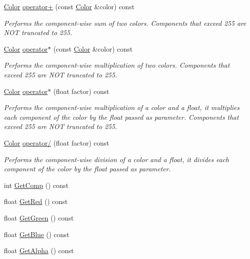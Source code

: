 \begin{DoxyCompactItemize}
\hyperlink{classColor}{Color} \hyperlink{classColor_acd40b26ca2f9217b5cde1e5c1251ef04}{operator+} (const \hyperlink{classColor}{Color} \&color) const
\begin{DoxyCompactList}\small\item\em Performs the component-\/wise sum of two colors. Components that exceed 255 are N\+OT truncated to 255. \end{DoxyCompactList}\item 
\hyperlink{classColor}{Color} \hyperlink{classColor_a6cc052b0ca852fb8703e642e49fcdbe9}{operator$\ast$} (const \hyperlink{classColor}{Color} \&color) const
\begin{DoxyCompactList}\small\item\em Performs the component-\/wise multiplication of two colors. Components that exceed 255 are N\+OT truncated to 255. \end{DoxyCompactList}\item 
\hyperlink{classColor}{Color} \hyperlink{classColor_a1913ac35b2deeabf7f9bc449deae499e}{operator$\ast$} (float factor) const
\begin{DoxyCompactList}\small\item\em Performs the component-\/wise multiplication of a color and a float, it multiplies each component of the color by the float passed as parameter. Components that exceed 255 are N\+OT truncated to 255. \end{DoxyCompactList}\item 
\hyperlink{classColor}{Color} \hyperlink{classColor_ac1591338c7f8714e3683cca15ffb2fd3}{operator/} (float factor) const
\begin{DoxyCompactList}\small\item\em Performs the component-\/wise division of a color and a float, it divides each component of the color by the float passed as parameter. \end{DoxyCompactList}\item 
int \hyperlink{classColor_ae63e798d250d1b1393008e019a054253}{Get\+Comp} () const
\item 
float \hyperlink{classColor_aaf750ff9360c9eb6abf1de07ec710c1e}{Get\+Red} () const
\item 
float \hyperlink{classColor_a0c1d09e2435aefad98931d765bc36d01}{Get\+Green} () const
\item 
float \hyperlink{classColor_a79e225ea938465a072b697b9431f8150}{Get\+Blue} () const
\item 
float \hyperlink{classColor_a1eb5d3ba0276e2b555211aae3cd500b6}{Get\+Alpha} () const

\end{DoxyCompactItemize}
